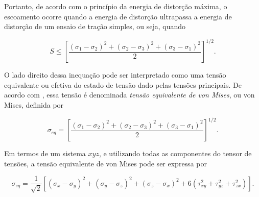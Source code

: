Portanto, de acordo com o princípio da energia de distorção máxima, o escoamento ocorre quando a energia de distorção ultrapassa a energia de distorção de um ensaio de tração simples, ou seja, quando \cite{Hibbeler}

\begin{equation}
    S \leq \left[\frac{(\sigma_1 - \sigma_2)^2 + (\sigma_2 - \sigma_3)^2 + (\sigma_3 - \sigma_1)^2}{2} \right]^{1/2}.
\end{equation}

O lado direito dessa inequação pode ser interpretado como uma tensão equivalente ou efetiva do estado de tensão dado pelas tensões principais. De acordo com \cite{Hibbeler}, essa tensão é denominada \emph{tensão equivalente de von Mises}, ou von Mises, definida por

\begin{equation}
    \sigma_{eq} = \left[\frac{(\sigma_1 - \sigma_2)^2 + (\sigma_2 - \sigma_3)^2 + (\sigma_3 - \sigma_1)^2}{2} \right]^{1/2}.
    \label{eq:tensao_equivalente_von_mises}
\end{equation}

Em termos de um sistema $xyz$, e utilizando todas as componentes do tensor de tensões, a tensão equivalente de von Mises pode ser expressa por 

\begin{equation}
    \sigma_{eq} = \frac{1}{\sqrt{2}} \left[ (\sigma_x - \sigma_y)^2 + (\sigma_y - \sigma_z)^2 + (\sigma_z - \sigma_x)^2 + 6(\tau_{xy}^2 + \tau_{yz}^2 + \tau_{zx}^2)\right].
    \label{eq:tensao_equivalente_von_mises_xyz}
\end{equation}